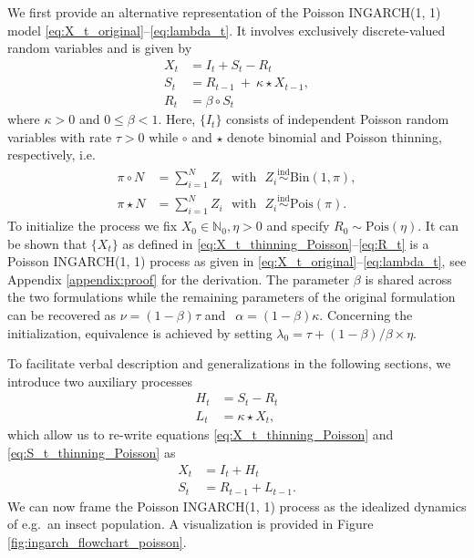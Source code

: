 \documentclass{article}
\begin{document}
We first provide an alternative representation of the Poisson INGARCH(1, 1) model \eqref{eq:X_t_original}--\eqref{eq:lambda_t}. It involves exclusively discrete-valued random variables and is given by
\begin{align}
X_t & = I_t + S_t - R_t \label{eq:X_t_thinning_Poisson}\\
S_t & = R_{t - 1} \ + \ \kappa \star X_{t - 1},\label{eq:S_t_thinning_Poisson}\\
R_t & = \beta \circ S_t \label{eq:R_t}
\end{align}
where $\kappa > 0$ and $0 \leq \beta < 1$. Here, $\{I_t\}$ consists of independent Poisson random variables with rate $\tau > 0$ while $\circ$ and $\star$ denote binomial and Poisson thinning, respectively, i.e.\
\begin{align*}
\pi \circ N & = \sum_{i = 1}^N Z_i \ \ \ \text{with} \ \ \ Z_i \stackrel{\text{ind}}{\sim} \text{Bin}(1, \pi), \\
\pi \star N & = \sum_{i = 1}^N Z_i \ \ \ \text{with} \ \ \ Z_i \stackrel{\text{ind}}{\sim} \text{Pois}(\pi).
\end{align*}
To initialize the process we fix $X_0 \in \mathbb{N}_0, \eta > 0$ and specify $R_0 \sim \text{Pois}\left(\eta \right)$. It can be shown that $\{X_t\}$ as defined in \eqref{eq:X_t_thinning_Poisson}--\eqref{eq:R_t} is a Poisson INGARCH(1, 1) process as given in \eqref{eq:X_t_original}--\eqref{eq:lambda_t}, see Appendix \ref{appendix:proof} for the derivation. The parameter $\beta$ is shared across the two formulations while the remaining parameters of the original formulation can be recovered as
$
\nu = (1 - \beta)\tau$ and $ \ \
\alpha = (1 - \beta)\kappa.
$
Concerning the initialization, equivalence is achieved by setting $\lambda_0 = \tau + (1 - \beta)/\beta \times \eta$.

To facilitate verbal description and generalizations in the following sections, we introduce two auxiliary processes
\begin{align}
H_t & = S_t - R_t \label{eq:H_t}\\
L_t & = \kappa \star X_t \label{eq:L_t},
\end{align}
which allow us to re-write equations \eqref{eq:X_t_thinning_Poisson} and \eqref{eq:S_t_thinning_Poisson} as
\begin{align}
X_t & = I_t + H_t\label{eq:X_t_v2}\\
S_t & = R_{t - 1} + L_{t - 1}.\label{eq:juv_t_v2}
\end{align}
We can now frame the Poisson INGARCH(1, 1) process as the idealized dynamics of e.g.\ an insect population. A visualization is provided in Figure \ref{fig:ingarch_flowchart_poisson}.
\end{document}
